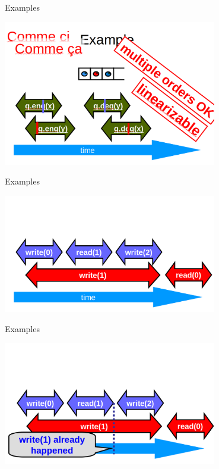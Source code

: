\begin{frame}{Examples}
\begin{center} \includegraphics[width=0.7\textwidth]{./pics/linear/80.png} \end{center}
\end{frame}

\begin{frame}{Examples}
\begin{center} \includegraphics[width=0.7\textwidth]{./pics/linear/81.png} \end{center}
\end{frame}

\begin{frame}{Examples}
\begin{center} \includegraphics[width=0.7\textwidth]{./pics/linear/82.png} \end{center}
\end{frame}

